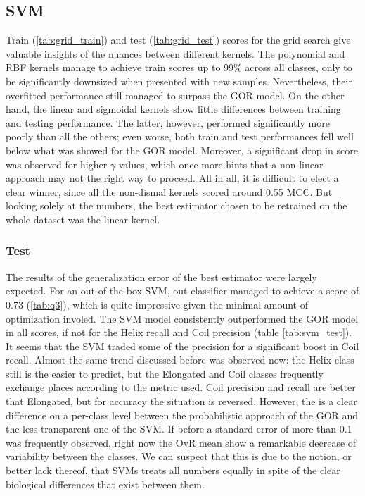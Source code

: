 \documentclass[nocrop]{bioinfo}
\begin{document}
\subsection*{SVM}

Train (\autoref{tab:grid_train}) and test (\autoref{tab:grid_test}) scores for the grid search give valuable insights of the nuances between different kernels.
The polynomial and RBF kernels manage to achieve train scores up to 99\% across all classes, only to be significantly downsized when presented with new samples.
Nevertheless, their overfitted performance still managed to surpass the GOR model.
On the other hand, the linear and sigmoidal kernels show little differences between training and testing performance.
The latter, however, performed significantly more poorly than all the others; even worse, both train and test performances fell well below what was showed for the GOR model.
Moreover, a significant drop in score was observed for higher $\gamma$ values, which once more hints that a non-linear approach may not the right way to proceed.
All in all, it is difficult to elect a clear winner, since all the non-dismal kernels scored around 0.55 MCC.
But looking solely at the numbers, the best estimator chosen to be retrained on the whole dataset was the linear kernel.

\subsubsection*{Test}
The results of the generalization error of the best estimator were largely expected.
For an out-of-the-box SVM, out classifier managed to achieve a score of 0.73 (\autoref{tab:q3}), which is quite impressive given the minimal amount of optimization involed.
The SVM model consistently outperformed the GOR model in all scores, if not for the Helix recall and Coil precision (table \autoref{tab:svm_test}).
It seems that the SVM traded some of the precision for a significant boost in Coil recall.
Almost the same trend discussed before was observed now: the Helix class still is the easier to predict, but the Elongated and Coil classes frequently exchange places according to the metric used.
Coil precision and recall are better that Elongated, but for accuracy the situation is reversed.
However, the is a clear difference on a per-class level between the probabilistic approach of the GOR and the less transparent one of the SVM.
If before a standard error of more than 0.1 was frequently observed, right now the OvR mean show a remarkable decrease of variability between the classes.
We can suspect that this is due to the notion, or better lack thereof, that SVMs treats all numbers equally in spite of the clear biological differences that exist between them.
\begin{table}[!tbh]
	\centering
	{}
\end{table}
\end{document}

